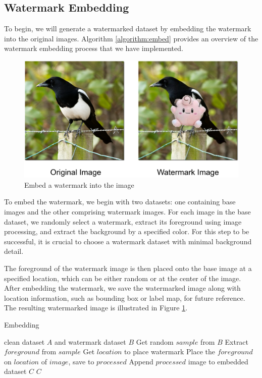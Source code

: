 %     

%     
\subsection{Watermark Embedding}
\label{chapter:d:section:emb}
To begin, we will generate a watermarked dataset by embedding the watermark into the original images. Algorithm \ref{algorithm:embed} provides an overview of the watermark embedding process that we have implemented.
\begin{figure}[t]
    \centering
    \includegraphics[width=0.75\linewidth]{img/embedded.png}
    \caption{Embed a watermark into the image}
    \label{figure:embed_img}
\end{figure}
To embed the watermark, we begin with two datasets: one containing base images and the other comprising watermark images. For each image in the base dataset, we randomly select a watermark, extract its foreground using image processing, and extract the background by a specified color. For this step to be successful, it is crucial to choose a watermark dataset with minimal background detail.

The foreground of the watermark image is then placed onto the base image at a specified location, which can be either random or at the center of the image. After embedding the watermark, we save the watermarked image along with location information, such as bounding box or label map, for future reference. The resulting watermarked image is illustrated in Figure \ref{figure:embed_img}.
\begin{algorithm}[t]
 \caption{Embedding}
 \label{algorithm:embed}
 \begin{algorithmic}[1]
   clean dataset $A$ and watermark dataset $B$
  \STATE Get random $sample$ from $B$
  \STATE Extract $foreground$ from $sample$
  \STATE Get $location$ to place watermark
  \STATE Place the $foreground$ on $location$ of $image$, save to $processed$
  \STATE Append $processed$ image to embedded dataset $C$
  \ENDFOR
   $C$
 \end{algorithmic}
\end{algorithm}
